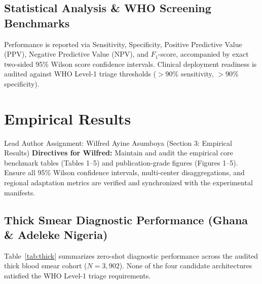 \documentclass[a4paper,11pt]{article}
\begin{document}
\subsection{Statistical Analysis \& WHO Screening Benchmarks}
Performance is reported via Sensitivity, Specificity, Positive Predictive Value (PPV), Negative Predictive Value (NPV), and $F_1$-score, accompanied by exact two-sided 95\% Wilson score confidence intervals. Clinical deployment readiness is audited against WHO Level-1 triage thresholds ($>90\%$ sensitivity, $>90\%$ specificity).

\section{Empirical Results}
\label{sec:results}

\begin{guidebox}{Lead Author Assignment: Wilfred Ayine Asumboya (Section 3: Empirical Results)}
\textbf{Directives for Wilfred:} Maintain and audit the empirical core benchmark tables (Tables 1--5) and publication-grade figures (Figures 1--5). Ensure all 95\% Wilson confidence intervals, multi-center disaggregations, and regional adaptation metrics are verified and synchronized with the experimental manifests.
\end{guidebox}

\vspace{0.4em}

\subsection{Thick Smear Diagnostic Performance (Ghana \& Adeleke Nigeria)}
Table~\ref{tab:thick} summarizes zero-shot diagnostic performance across the audited thick blood smear cohort ($N = 3,902$). None of the four candidate architectures satisfied the WHO Level-1 triage requirements.

\begin{table}[htbp]
\centering
\small
\caption{Diagnostic performance on Audited Thick Blood Smear Cohort ($N = 3,902$, post-quarantine).}
\label{tab:thick}
\end{table}
\end{document}

